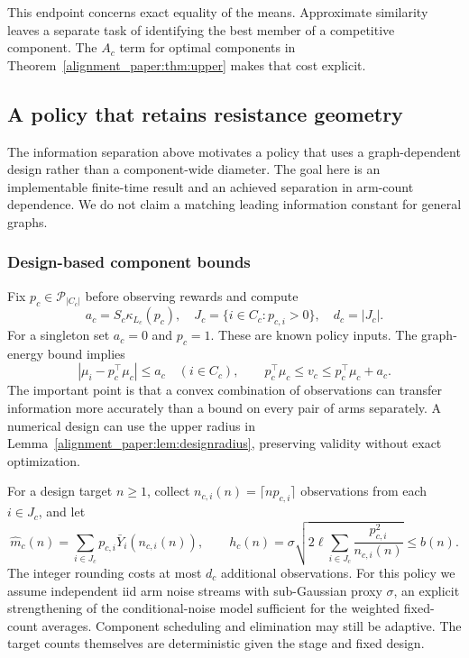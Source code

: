 This endpoint concerns exact equality of the means. Approximate similarity leaves a separate task of identifying the best member of a competitive component. The $A_c$ term for optimal components in Theorem~\ref{alignment_paper:thm:upper} makes that cost explicit.


\subsection{A policy that retains resistance geometry}
The information separation above motivates a policy that uses a graph-dependent design rather than a component-wide diameter. The goal here is an implementable finite-time result and an achieved separation in arm-count dependence. We do not claim a matching leading information constant for general graphs.

\subsubsection{Design-based component bounds}
Fix $p_c\in\mathscr P_{|C_c|}$ before observing rewards and compute
\begin{equation}
 a_c=S_c\kappa_{L_c}(p_c),\quad
 J_c=\{i\in C_c:p_{c,i}>0\},\quad d_c=|J_c|.
 \label{alignment_paper:eq:designbias}
\end{equation}
For a singleton set $a_c=0$ and $p_c=1$. These are known policy inputs. The graph-energy bound implies
\begin{equation}
 |\mu_i-p_c^\top\mu_c|\le a_c\quad(i\in C_c),\qquad
 p_c^\top\mu_c\le v_c\le p_c^\top\mu_c+a_c.
 \label{alignment_paper:eq:designtransfer}
\end{equation}
The important point is that a convex combination of observations can transfer information more accurately than a bound on every pair of arms separately. A numerical design can use the upper radius in Lemma~\ref{alignment_paper:lem:designradius}, preserving validity without exact optimization.

For a design target $n\ge1$, collect
$n_{c,i}(n)=\lceil np_{c,i}\rceil$ observations from each $i\in J_c$, and let
\begin{equation}
 \widehat m_c(n)=\sum_{i\in J_c}p_{c,i}\bar Y_i(n_{c,i}(n)),\qquad
 h_c(n)=\sigma\sqrt{2\ell\sum_{i\in J_c}
                     \frac{p_{c,i}^2}{n_{c,i}(n)}}\le b(n).
 \label{alignment_paper:eq:designestimate}
\end{equation}
The integer rounding costs at most $d_c$ additional observations. For this policy we assume independent iid arm noise streams with sub-Gaussian proxy $\sigma$, an explicit strengthening of the conditional-noise model sufficient for the weighted fixed-count averages. Component scheduling and elimination may still be adaptive. The target counts themselves are deterministic given the stage and fixed design.


